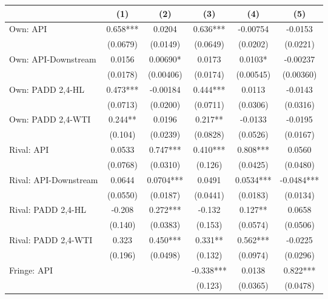 {
\def\sym#1{\ifmmode^{#1}\else\(^{#1}\)\fi}
\begin{tabular}{l*{5}{c}}
\toprule
                &\multicolumn{1}{c}{(1)}   &\multicolumn{1}{c}{(2)}   &\multicolumn{1}{c}{(3)}   &\multicolumn{1}{c}{(4)}   &\multicolumn{1}{c}{(5)}   \\
\midrule
Own: API        &    0.658***&   0.0204   &    0.636***& -0.00754   &  -0.0153   \\
                & (0.0679)   & (0.0149)   & (0.0649)   & (0.0202)   & (0.0221)   \\
\addlinespace
Own: API-Downstream&   0.0156   &  0.00690*  &   0.0173   &   0.0103*  & -0.00237   \\
                & (0.0178)   &(0.00406)   & (0.0174)   &(0.00545)   &(0.00360)   \\
\addlinespace
Own: PADD 2,4-HL&    0.473***& -0.00184   &    0.444***&   0.0113   &  -0.0143   \\
                & (0.0713)   & (0.0200)   & (0.0711)   & (0.0306)   & (0.0316)   \\
\addlinespace
Own: PADD 2,4-WTI&    0.244** &   0.0196   &    0.217** &  -0.0133   &  -0.0195   \\
                &  (0.104)   & (0.0239)   & (0.0828)   & (0.0526)   & (0.0167)   \\
\addlinespace
Rival: API      &   0.0533   &    0.747***&    0.410***&    0.808***&   0.0560   \\
                & (0.0768)   & (0.0310)   &  (0.126)   & (0.0425)   & (0.0480)   \\
\addlinespace
Rival: API-Downstream&   0.0644   &   0.0704***&   0.0491   &   0.0534***&  -0.0484***\\
                & (0.0550)   & (0.0187)   & (0.0441)   & (0.0183)   & (0.0134)   \\
\addlinespace
Rival: PADD 2,4-HL&   -0.208   &    0.272***&   -0.132   &    0.127** &   0.0658   \\
                &  (0.140)   & (0.0383)   &  (0.153)   & (0.0574)   & (0.0506)   \\
\addlinespace
Rival: PADD 2,4-WTI&    0.323   &    0.450***&    0.331** &    0.562***&  -0.0225   \\
                &  (0.196)   & (0.0498)   &  (0.132)   & (0.0974)   & (0.0296)   \\
\addlinespace
Fringe: API     &            &            &   -0.338***&   0.0138   &    0.822***\\
                &            &            &  (0.123)   & (0.0365)   & (0.0478)   \\

\end{tabular}}
